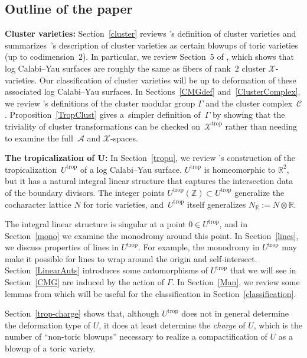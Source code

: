 \documentclass[10pt,a4paper]{amsart}
\numberwithin{equation}{section}
\numberwithin{figure}{section}
\numberwithin{table}{section}
\DeclareMathOperator{\trop}{trop}
\let\bb=\mathbb
\let\s=\mathcal
\theoremstyle{definition}
\begin{document}
\subsection{Outline of the paper}

{\bf Cluster varieties:} Section~\ref{cluster} reviews \cite{FG1}'s definition of cluster varieties and summarizes~\cite{GHK3}'s description of cluster varieties as certain blowups of toric varieties (up to codimension~$2$). In particular, we review Section~5 of \cite{GHK3}, which shows that log Calabi--Yau surfaces are roughly the same as fibers of rank~$2$ cluster $\s{X}$-varieties. Our classification of cluster varieties will be up to deformation of these associated log Calabi--Yau surfaces. In Sections~\ref{CMGdef} and~\ref{ClusterComplex}, we review \cite{FG1}'s definitions of the cluster modular group $\Gamma$ and the cluster complex~$\s{C}$. Proposition~\ref{TropClust} gives a~simpler definition of~$\Gamma$ by showing that the triviality of cluster transformations can be checked on~$\s{X}^{\trop}$ rather than needing to examine the full~$\s{A}$ and $\s{X}$-spaces.

{\bf The tropicalization of $\boldsymbol{U}$:} In Section~\ref{tropu}, we review \cite{GHK1}'s construction of the tropicaliza\-tion~$U^{\trop}$ of a log Calabi--Yau surface. $U^{\trop}$ is homeomorphic to $\bb{R}^2$, but it has a natural integral linear structure that captures the intersection data of the boundary divisors. The integer points $U^{\trop}(\bb{Z})\subset U^{\trop}$ generalize the cocharacter lattice $N$ for toric varieties, and~$U^{\trop}$ itself generalizes $N_{\bb{R}}:=N\otimes \bb{R}$.

The integral linear structure is singular at a point $0\in U^{\trop}$, and in Section~\ref{mono} we examine the monodromy around this point. In Section~\ref{lines}, we discuss properties of lines in $U^{\trop}$. For example, the monodromy in $U^{\trop}$ may make it possible for lines to wrap around the origin and self-intersect. Section~\ref{LinearAuts} introduces some automorphisms of $U^{\trop}$ that we will see in Section~\ref{CMG} are induced by the action of $\Gamma$. In Section~\ref{Man}, we review some lemmas from \cite{Man1} which will be useful for the classification in Section~\ref{classification}.

Section~\ref{trop-charge} shows that, although $U^{\trop}$ does not in general determine the deformation type of $U$, it does at least determine the {\it charge} of $U$, which is the number of ``non-toric blowups'' necessary to realize a compactification of $U$ as a blowup of a toric variety.
\end{document}
